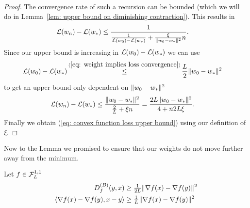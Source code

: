\begin{proof}
	The convergence rate of such a recursion can be bounded (which we will do in
	Lemma~\ref{lem: upper bound on diminishing contraction}). This results in 
	\begin{align*}
		\mathcal{L}(w_n)-\mathcal{L}(w_*)
		&\le \frac{1}{
			\frac{1}{\mathcal{L}(w_0)-\mathcal{L}(w_*)} + \tfrac{\xi}{\|w_0-w_*\|^2}n
		}.
	\end{align*}
	Since our upper bound is increasing in \(\mathcal{L}(w_0)-\mathcal{L}(w_*)\)
	we can use
	\begin{align*}
		\Loss(\weights_0) - \Loss(\minimum)
		&\xle{(\ref{eq: weight implies loss convergence})}
		\frac{\ubound}{2}\|\weights_0-\minimum\|^2
	\end{align*}
	to get an upper bound only dependent on \(\|w_0 - w_*\|^2\)
	\begin{align*}
		\mathcal{L}(w_n)-\mathcal{L}(w_*)
		&\le \frac{\|w_0-w_*\|^2}{
			\frac{2}{L} + \xi n
		}
		= \frac{2L\|w_0-w_*\|^2}{
			4 + n 2L \xi
		}.
	\end{align*}
	Finally we obtain (\ref{eq: convex function loss upper bound}) using our
	definition of \(\xi\).
\end{proof}
%
Now to the Lemma we promised to ensure that our weights do not move further away
from the minimum.
%
\begin{lemma}\label{lem: bermanDiv lower bound}
	Let \(f\in\mathcal{F}^{1,1}_{L}\)
	\begin{subequations}
	\begin{align}
		D^{(B)}_{f}(y,x)
		&\ge \tfrac{1}{2L}\|\nabla f(x) - \nabla f(y)\|^2\\
		\label{eq: bregmanDiv lower bound b}
		\langle \nabla f(x) - \nabla f(y), x-y\rangle
		&\ge \tfrac{1}{L}\|\nabla f(x) - \nabla f(y)\|^2
	\end{align}	
	\end{subequations}	
\end{lemma}
